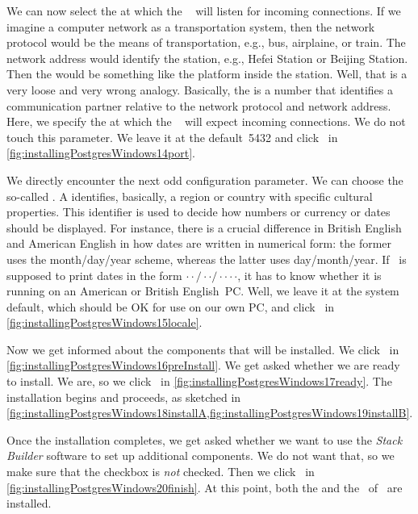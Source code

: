 We can now select the  at which the \postgresql\  will listen for incoming connections.
If we imagine a computer network as a transportation system, then the network protocol would be the means of transportation, e.g., bus, airplaine, or train.
The network address would identify the station, e.g., Hefei Station or Beijing Station.
Then the \emph{} would be something like the platform inside the station.
Well, that is a very loose and very wrong analogy.
Basically, the  is a number that identifies a communication partner relative to the network protocol and network address.
Here, we specify the  at which the \postgresql\  will expect incoming connections.
We do not touch this parameter.
We leave it at the default~5432 and click~ in \cref{fig:installingPostgresWindows14port}.

We directly encounter the next odd configuration parameter.
We can choose the so-called .
A  identifies, basically, a region or country with specific cultural properties.
This identifier is used to decide how numbers or currency or dates should be displayed.
For instance, there is a crucial difference in British English and American English in how dates are written in numerical form:
the former uses the month/day/year scheme, whereas the latter uses day/month/year.
If \postgresql\ is supposed to print dates in the form $\cdot\cdot/\cdot\cdot/\cdot\cdot\cdot\cdot$, it has to know whether it is running on an American or British English~PC.
Well, we leave it at the system default, which should be OK for use on our own PC, and click~ in \cref{fig:installingPostgresWindows15locale}.

Now we get informed about the components that will be installed.
We click~ in \cref{fig:installingPostgresWindows16preInstall}.
We get asked whether we are ready to install.
We are, so we click~ in \cref{fig:installingPostgresWindows17ready}.
The installation begins and proceeds, as sketched in \cref{fig:installingPostgresWindows18installA,fig:installingPostgresWindows19installB}.

Once the installation completes, we get asked whether we want to use the \emph{Stack Builder} software to set up additional components. %
We do not want that, so we make sure that the checkbox is \emph{not} checked.
Then we click~ in \cref{fig:installingPostgresWindows20finish}.
At this point, both the   and the  \psql\ of \postgresql\ are installed.

